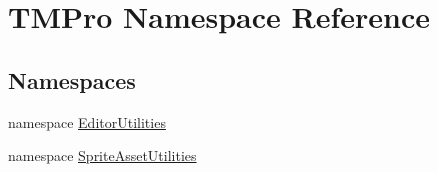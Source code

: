 \hypertarget{namespace_t_m_pro}{}\section{T\+M\+Pro Namespace Reference}
\label{namespace_t_m_pro}
\subsection*{Namespaces}
\begin{DoxyCompactItemize}
\item 
namespace \mbox{\hyperlink{namespace_t_m_pro_1_1_editor_utilities}{Editor\+Utilities}}
\item 
namespace \mbox{\hyperlink{namespace_t_m_pro_1_1_sprite_asset_utilities}{Sprite\+Asset\+Utilities}}
\end{DoxyCompactItemize}
